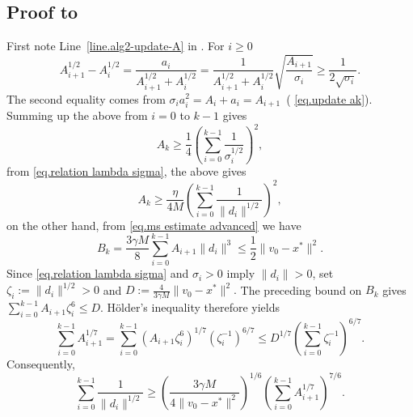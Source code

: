 \documentclass[moor,sglanonrev]{informs4}
\begin{document}
\begin{APPENDICES}
    \subsection*{Proof to }\label{sec.app-c}
    {\color{red} First note Line~\ref{line.alg2-update-A} in .} For $i\geq 0$
    \begin{equation*}
        A_{i+1}^{1/2}-A_i^{1/2} = \frac{a_i}{A_{i+1}^{1/2}+A_i^{1/2}}=\frac{1}{A_{i+1}^{1/2}+A_i^{1/2}}\sqrt{\frac{A_{i+1}}{\sigma_i}}\geq \frac{1}{2\sqrt{\sigma_i}}.
    \end{equation*}
    The second equality comes from $\sigma_ia_i^2=A_i+a_i=A_{i+1}$~({\color{red} \eqref{eq.update ak}}). Summing up the above from $i=0$ to $k-1$ gives
    \begin{equation*}
        A_k \geq \frac{1}{4} \left (\sum_{i=0}^{k-1}\frac{1}{\sigma_i^{1/2}}\right)^2,
    \end{equation*}
    from \eqref{eq.relation lambda sigma}, the above gives
    \begin{equation}\label{eq.Ak helper 1}
        A_k \geq \frac{\eta}{4M} \left (\sum_{i=0}^{k-1} \frac{1}{\|d_i\|^{1/2}}\right)^2,
    \end{equation}
    on the other hand, from \eqref{eq.ms estimate advanced} we have
    \begin{equation*}
        B_k = \frac{3\gamma M}{8}\sum_{i=0}^{k-1} A_{i+1}\|d_i\|^3 \leq \frac{1}{2}\|v_0-x^*\|^2.
    \end{equation*}
    Since \eqref{eq.relation lambda sigma} and $\sigma_i>0$ imply $\|d_i\|>0$, set
    \(
        \zeta_i:=\|d_i\|^{1/2}>0
    \)
    and
    \(
        D:=\frac{4}{3\gamma M}\|v_0-x^*\|^2.
    \)
    The preceding bound on $B_k$ gives
    \(
        \sum_{i=0}^{k-1}A_{i+1}\zeta_i^6\leq D.
    \)
    H\"older's inequality therefore yields
    \begin{equation*}
        \sum_{i=0}^{k-1}A_{i+1}^{1/7}
        =\sum_{i=0}^{k-1}
        \left(A_{i+1}\zeta_i^6\right)^{1/7}
        \left(\zeta_i^{-1}\right)^{6/7}
        \leq
        D^{1/7}
        \left(\sum_{i=0}^{k-1}\zeta_i^{-1}\right)^{6/7}.
    \end{equation*}
    Consequently,
    \begin{equation*}
        \sum_{i=0}^{k-1}\frac{1}{\|d_i\|^{1/2}}
        \geq
        \left(\frac{3\gamma M}{4\|v_0-x^*\|^2}\right)^{1/6}
        \left(\sum_{i=0}^{k-1}A_{i+1}^{1/7}\right)^{7/6}.
    \end{equation*}

\end{APPENDICES}
\end{document}
